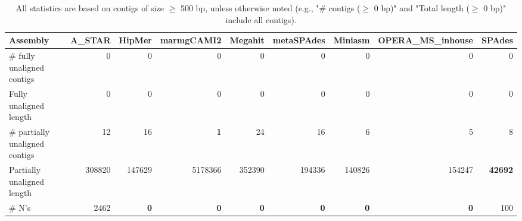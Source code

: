 \documentclass[12pt,a4paper]{article}
\begin{document}
\begin{table}[ht]
\begin{center}
\caption{All statistics are based on contigs of size $\geq$ 500 bp, unless otherwise noted (e.g., "\# contigs ($\geq$ 0 bp)" and "Total length ($\geq$ 0 bp)" include all contigs).}
\begin{tabular}{|l*{8}{|r}|}
\hline
Assembly & A\_STAR & HipMer & marmgCAMI2 & Megahit & metaSPAdes & Miniasm & OPERA\_MS\_inhouse & SPAdes \\ \hline
\# fully unaligned contigs & 0 & 0 & 0 & 0 & 0 & 0 & 0 & 0 \\ \hline
Fully unaligned length & 0 & 0 & 0 & 0 & 0 & 0 & 0 & 0 \\ \hline
\# partially unaligned contigs & 12 & 16 & {\bf 1} & 24 & 16 & 6 & 5 & 8 \\ \hline
Partially unaligned length & 308820 & 147629 & 5178366 & 352390 & 194336 & 140826 & 154247 & {\bf 42692} \\ \hline
\# N's & 2462 & {\bf 0} & {\bf 0} & {\bf 0} & {\bf 0} & {\bf 0} & {\bf 0} & 100 \\ \hline
\end{tabular}
\end{center}
\end{table}
\end{document}
